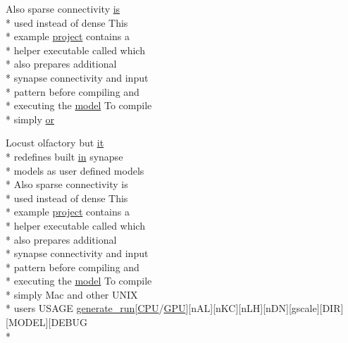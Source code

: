 \begin{DoxyCompactItemize}
Also sparse connectivity \hyperlink{userproject_2MBody__userdef__project_2README_8txt_a7b4e6cf78d14ce882cb8ff127e01babd}{is} \\*
used instead of dense This \\*
example \hyperlink{userproject_2SynDelay__project_2README_8txt_a762c750134e07a31b7965860fd292b51}{project} contains a \\*
helper executable called which \\*
also prepares additional \\*
synapse connectivity and input \\*
pattern before compiling and \\*
executing the \hyperlink{README_8txt_a69fd801b7213948c12d9dd7eebb3ed14}{model} To compile \\*
simply \hyperlink{userproject_2MBody__userdef__project_2README_8txt_a262ed8e4e0bdc8dd97213d657e77bdd4}{or}
\item 
Locust olfactory but \hyperlink{userproject_2PoissonIzh__project_2README_8txt_a3e3bbb6c9b14c38757cf273a117e43e8}{it} \\*
redefines built \hyperlink{README_8txt_a148897a6b2cc9cff25af80abb13426b0}{in} synapse \\*
models as user defined models \\*
Also sparse connectivity is \\*
used instead of dense This \\*
example \hyperlink{userproject_2SynDelay__project_2README_8txt_a762c750134e07a31b7965860fd292b51}{project} contains a \\*
helper executable called which \\*
also prepares additional \\*
synapse connectivity and input \\*
pattern before compiling and \\*
executing the \hyperlink{README_8txt_a69fd801b7213948c12d9dd7eebb3ed14}{model} To compile \\*
simply Mac and other U\+N\+I\+X \\*
users U\+S\+A\+G\+E \hyperlink{userproject_2MBody__userdef__project_2README_8txt_a320a215d1e27b4de394be70e90d22863}{generate\+\_\+run}\mbox{[}\hyperlink{README_8txt_a74a069e3c75797de2636c4dd14daa147}{C\+P\+U}/\hyperlink{modelSpec_8h_a39cb9803524b6f3b783344b2f89867b4}{G\+P\+U}\mbox{]}\mbox{[}n\+A\+L\mbox{]}\mbox{[}n\+K\+C\mbox{]}\mbox{[}n\+L\+H\mbox{]}\mbox{[}n\+D\+N\mbox{]}\mbox{[}gscale\mbox{]}\mbox{[}D\+I\+R\mbox{]}\mbox{[}M\+O\+D\+E\+L\mbox{]}\mbox{[}D\+E\+B\+U\+G \\*

\end{DoxyCompactItemize}
